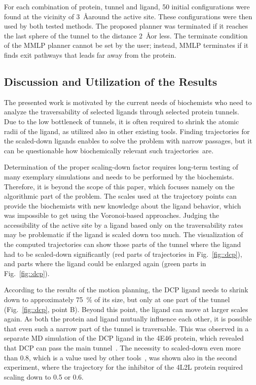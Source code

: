 \documentclass{bmcart}
\begin{document}
For each combination of protein, tunnel and ligand, 50 initial configurations were found at the vicinity of 3~\AA around the active site.
These configurations were then used by both tested methods.
The proposed planner was terminated if it reaches the last sphere of the tunnel to the distance 2~\AA or less.
The terminate condition of the MMLP planner cannot be set by the user; instead, MMLP terminates if it finds exit pathways that leads far away from the protein.





\subsection*{Discussion and Utilization of the Results}
The presented work is motivated by the current needs of biochemists who need to analyze the traversability of selected ligands through selected protein tunnels.
Due to the low bottleneck of tunnels, it is often required to shrink the atomic radii of the ligand, as utilized also in other existing tools.
Finding trajectories for the scaled-down ligands enables to solve the problem with narrow passages, but it can be questionable how biochemically relevant such trajectories~are.

Determination of the proper scaling-down factor requires long-term testing of many exemplary simulations and needs to be performed by the biochemists. 
Therefore, it is beyond the scope of this paper, which focuses namely on the algorithmic part of the problem.
The scales used at the trajectory points can provide the biochemists with new knowledge about the ligand behavior, which was impossible to get using the Voronoi-based approaches.
Judging the accessibility of the active site by a ligand based only on the traversability rates may be problematic if the ligand is scaled down too much.
The visualization of the computed trajectories can show those parts of the tunnel where the ligand had to be scaled-down significantly (red parts of trajectories in Fig.~\ref{fig::dcp}), and parts where the ligand could be enlarged again (green parts in Fig.~\ref{fig::dcp}).

According to the results of the motion planning, the DCP ligand needs to shrink down to approximately 75~\% of its size, but only at one part of the tunnel (Fig.~\ref{fig::dcp}, point B). 
Beyond this point, the ligand can move at larger scales again.
As both the protein and ligand mutually influence each other, it is possible that even such a narrow part of the tunnel is traversable.
This was observed in a separate MD simulation of the DCP ligand in the 4E46 protein, which revealed that DCP can pass the main tunnel~\cite{marques2017catalytic}. 
The necessity to scaled-down even more than 0.8, which is a value used by other tools~\cite{cortes2010simulating}, was
shown also in the second experiment, where the trajectory for the inhibitor of the 4L2L protein required scaling down to 0.5 or 0.6.
\end{document}
